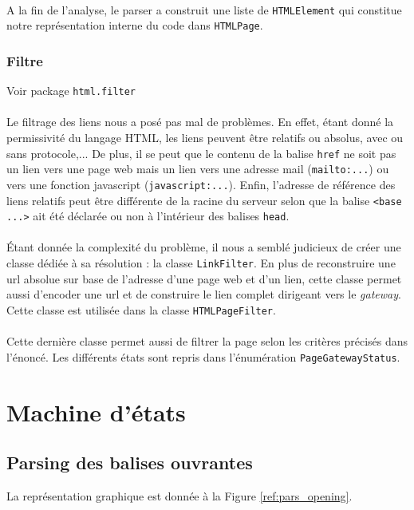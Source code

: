 \documentclass[a4paper,11pt]{article}
\newcommand{\ttseek}[1]{Voir package \texttt{#1}\paragraph{}}
\begin{document}
\paragraph{}
A la fin de l'analyse, le parser a construit une liste de \texttt{HTMLElement} qui constitue notre représentation interne du code dans \texttt{HTMLPage}.
\subsubsection{Filtre}
\ttseek{html.filter}
Le filtrage des liens nous a posé pas mal de problèmes. En effet, étant donné la permissivité du langage HTML, les liens peuvent être relatifs ou absolus, avec ou sans protocole,... De plus, il se peut que le contenu de la balise \texttt{href} ne soit pas un lien vers une page web mais un lien vers une adresse mail (\texttt{mailto:...}) ou vers une fonction javascript (\texttt{javascript:...}). Enfin, l'adresse de référence des liens relatifs peut être différente de la racine du serveur selon que la balise \texttt{<base ...>} ait été déclarée ou non à l'intérieur des balises \texttt{head}. 
\paragraph{}
Étant donnée la complexité du problème, il nous a semblé judicieux de créer une classe dédiée à sa résolution : la classe \texttt{LinkFilter}. En plus de reconstruire une url absolue sur base de l'adresse d'une page web et d'un lien, cette classe permet aussi d'encoder une url et de construire le lien complet dirigeant vers le \textit{gateway}. Cette classe est utilisée dans la classe \texttt{HTMLPageFilter}.
\paragraph{}
Cette dernière classe permet aussi de filtrer la page selon les critères précisés dans l'énoncé. Les différents états sont repris dans l'énumération \texttt{PageGatewayStatus}.
\newpage
\appendix
\section{Machine d'états}
\subsection{Parsing des balises ouvrantes}
La représentation graphique est donnée à la Figure \ref{ref:pars_opening}.
\end{document}
